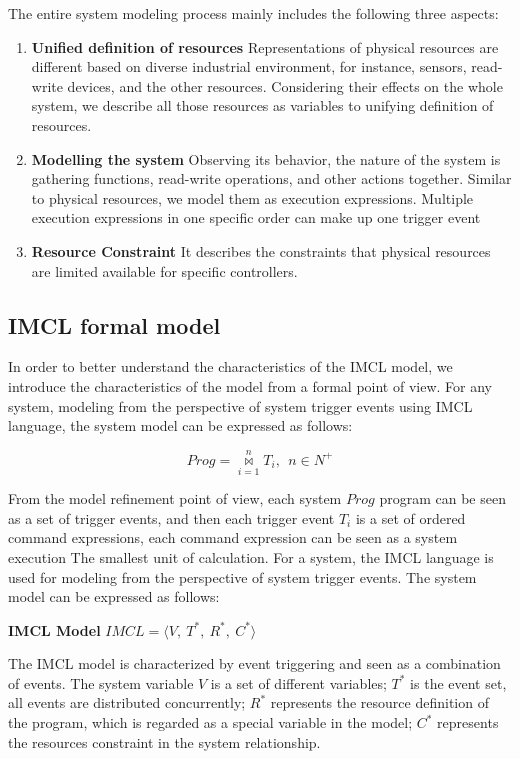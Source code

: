 The entire system modeling process mainly includes the following three aspects:
\begin{enumerate}
  \item \textbf{Unified definition of resources} Representations of physical resources are different based on diverse industrial environment, for instance, sensors, read-write devices, and the other resources. Considering their effects on the whole system, we describe all those resources as variables to unifying definition of resources.
  \item \textbf{Modelling the system} Observing its behavior, the nature of the system is gathering functions, read-write operations, and other actions together. Similar to physical resources, we model them as execution expressions. Multiple execution expressions in one specific order can make up one trigger event
  \item \textbf{Resource Constraint}  It describes the constraints that physical resources are limited available for specific controllers.
\end{enumerate}

\subsection{IMCL formal model}
In order to better understand the characteristics of the IMCL model, we introduce the characteristics of the model from a formal point of view. For any system, modeling from the perspective of system trigger events using IMCL language, the system model can be expressed as follows:

\begin{displaymath}
Prog = \overset{n}{\underset{i=1}{\bowtie}} T_{i}, \ \ n \in N^{+}
\end{displaymath}

From the model refinement point of view, each system $Prog$ program can be seen as a set of trigger events, and then each trigger event $T_i$ is a set of ordered command expressions, each command expression can be seen as a system execution The smallest unit of calculation. For a system, the IMCL language is used for modeling from the perspective of system trigger events. The system model can be expressed as follows:

\begin{definition} \textbf{IMCL Model} $IMCL = \langle V, \ T^{*}, \ R^{*}, \ C^{*}\rangle$
\end{definition}
The IMCL model is characterized by event triggering and seen as a combination of events. The system variable $V$ is a set of different variables; $T^{*}$ is the event set, all events are distributed concurrently; $R^{*}$ represents the resource definition of the program, which is regarded as a special variable in the model; $C^{*}$ represents the resources constraint in the system relationship.

